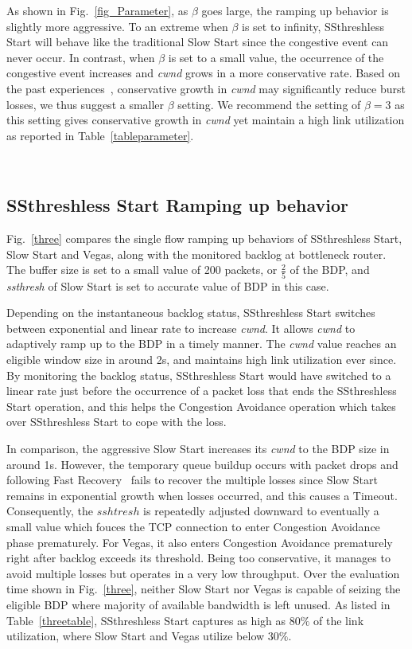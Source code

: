 \documentclass[12pt,onecolumn]{IEEEtran}
\begin{document}
As shown in Fig.~\ref{fig_Parameter}, as $\beta$ goes large, the ramping up
behavior is slightly more aggressive. To an extreme when $\beta$ is set to
infinity, SSthreshless Start will behave like the traditional Slow Start since
the congestive event can never occur. In contrast, when $\beta$ is set to a
small value, the occurrence of the congestive event increases and \emph{cwnd}
grows in a more conservative rate. Based on the past
experiences~\cite{limited,smoothstart1}, conservative growth in \emph{cwnd} may
significantly reduce burst losses, we thus suggest a smaller $\beta$ setting.
We recommend the setting of $\beta=3$ as this setting gives conservative growth
in \emph{cwnd} yet maintain a high link utilization as reported in
Table~\ref{tableparameter}.

~\subsection{SSthreshless Start Ramping up behavior}

Fig.~\ref{three} compares the single flow ramping up behaviors of SSthreshless
Start, Slow Start and Vegas, along with the monitored backlog at bottleneck
router. The buffer size is set to a small value of 200 packets, or
$\frac{2}{5}$ of the BDP, and \emph{ssthresh} of Slow Start is set to accurate
value of BDP in this case.

Depending on the instantaneous backlog status, SSthreshless Start switches
between exponential and linear rate to increase \emph{cwnd}. It allows
\emph{cwnd} to adaptively ramp up to the BDP in a timely manner. The
\emph{cwnd} value reaches an eligible window size in around 2s, and maintains
high link utilization ever since. By monitoring the backlog status, SSthreshless
Start would have switched to a linear rate just before the occurrence of a
packet loss that ends the SSthreshless Start operation, and this helps the
Congestion Avoidance operation which takes over SSthreshless Start to cope with
the loss.

In comparison, the aggressive Slow Start increases its \emph{cwnd} to the BDP
size in around 1s. However, the temporary queue buildup occurs with packet
drops and following Fast Recovery~\cite{newreno} fails to recover the multiple
losses since Slow Start remains in exponential growth when losses occurred, and
this causes a Timeout. Consequently, the $sshtresh$ is repeatedly adjusted
downward to eventually a small value which fouces the TCP connection to enter Congestion Avoidance phase
prematurely. For Vegas, it also enters Congestion Avoidance prematurely right
after backlog exceeds its threshold. Being too conservative, it manages to
avoid multiple losses but operates in a very low throughput. Over the
evaluation time shown in Fig.~\ref{three}, neither Slow Start nor Vegas is
capable of seizing the eligible BDP where majority of available bandwidth is
left unused. As listed in Table~\ref{threetable}, SSthreshless Start captures
as high as $80\%$ of the link utilization, where Slow Start and Vegas utilize
below $30\%$.
\end{document}
